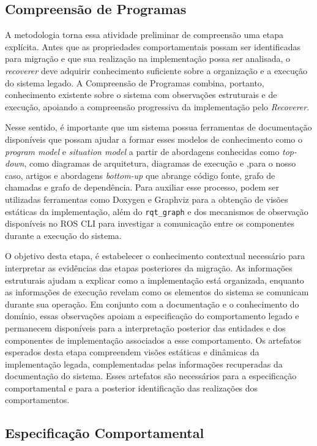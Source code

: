 \subsection{Compreensão de Programas}


A metodologia torna essa atividade preliminar de compreensão uma etapa explícita. Antes que as propriedades comportamentais possam ser identificadas para migração e que sua realização na implementação possa ser analisada, o \textit{recoverer} deve adquirir conhecimento suficiente sobre a organização e a execução do sistema legado. A Compreensão de Programas combina, portanto, conhecimento existente sobre o sistema com observações estruturais e de execução, apoiando a compreensão progressiva da implementação pelo \textit{Recoverer}.

Nesse sentido, é importante que um sistema possua ferramentas de documentação disponíveis que possam ajudar a formar esses modelos de conhecimento como o \textit{program model} e \textit{situation model} a partir de abordagens conhecidas como \textit{top-down}, como diagramas de arquitetura, diagramas de execução e ,para o nosso caso, artigos e abordagens \textit{bottom-up} que abrange código fonte, grafo de chamadas e grafo de dependência. Para auxiliar esse processo, podem ser utilizadas ferramentas como Doxygen e Graphviz para a obtenção de visões estáticas da implementação, além do \texttt{rqt\_graph} e dos mecanismos de observação disponíveis no ROS CLI para investigar a comunicação entre os componentes durante a execução do sistema.

O objetivo desta etapa, é estabelecer o conhecimento contextual necessário para interpretar as evidências das etapas posteriores da migração. As informações estruturais ajudam a explicar como a implementação está organizada, enquanto as informações de execução revelam como os elementos do sistema se comunicam durante sua operação. Em conjunto com a documentação e o conhecimento do domínio, essas observações apoiam a especificação do comportamento legado e permanecem disponíveis para a interpretação posterior das entidades e dos componentes de implementação associados a esse comportamento. Os artefatos esperados desta etapa compreendem
visões estáticas e dinâmicas da implementação legada, complementadas pelas informações recuperadas da documentação do sistema. Esses artefatos são necessários para a especificação comportamental e para a posterior identificação das realizações dos comportamentos.


\subsection{Especificação Comportamental}

